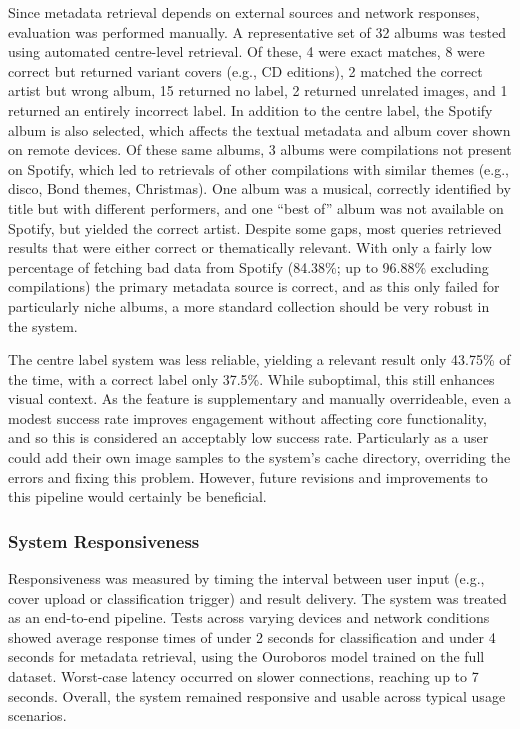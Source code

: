                 Since metadata retrieval depends on external sources and network responses, evaluation was performed manually. A representative set of 32 albums was tested using automated centre-level retrieval. Of these, 4 were exact matches, 8 were correct but returned variant covers (e.g., CD editions), 2 matched the correct artist but wrong album, 15 returned no label, 2 returned unrelated images, and 1 returned an entirely incorrect label. In addition to the centre label, the Spotify album is also selected, which affects the textual metadata and album cover shown on remote devices. Of these same albums, 3 albums were compilations not present on Spotify, which led to retrievals of other compilations with similar themes (e.g., disco, Bond themes, Christmas). One album was a musical, correctly identified by title but with different performers, and one “best of” album was not available on Spotify, but yielded the correct artist. Despite some gaps, most queries retrieved results that were either correct or thematically relevant. With only a fairly low percentage of fetching bad data from Spotify (84.38\%; up to 96.88\% excluding compilations) the primary metadata source is correct, and as this only failed for particularly niche albums, a more standard collection should be very robust in the system.
    
                The centre label system was less reliable, yielding a relevant result only 43.75\% of the time, with a correct label only 37.5\%. While suboptimal, this still enhances visual context. As the feature is supplementary and manually overrideable, even a modest success rate improves engagement without affecting core functionality, and so this is considered an acceptably low success rate. Particularly as a user could add their own image samples to the system's cache directory, overriding the errors and fixing this problem. However, future revisions and improvements to this pipeline would certainly be beneficial.
    
            \subsubsection{System Responsiveness}
    
                Responsiveness was measured by timing the interval between user input (e.g., cover upload or classification trigger) and result delivery. The system was treated as an end-to-end pipeline. Tests across varying devices and network conditions showed average response times of under 2 seconds for classification and under 4 seconds for metadata retrieval, using the Ouroboros model trained on the full dataset. Worst-case latency occurred on slower connections, reaching up to 7 seconds. Overall, the system remained responsive and usable across typical usage scenarios.
    
